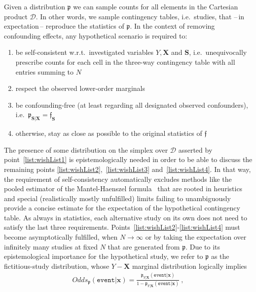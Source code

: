 \documentclass[10pt]{article}
\newcommand{\equ}[1]{\begin{gather} #1 \end{gather}}
\newcommand{\prob}[1]{\mathfrak{#1}}
\begin{document}
Given a distribution $\prob p$ we can sample counts for all elements in the Cartesian product $\mathcal D$. In other words, we sample %
contingency tables, i.e.\ studies, that --\,in expectation\,-- reproduce the statistics of $\prob p$. 
%
In the context of removing confounding effects, any hypothetical scenario is required  to: 
\begin{enumerate}
    \item be self-consistent w.r.t.\ investigated variables $Y,\boldsymbol X$ and $\boldsymbol S$, i.e.\ unequivocally prescribe counts %
    for each cell in the three-way contingency table with all entries summing to $N$ \label{list:wishList1}
    \item respect the observed lower-order marginals \label{list:wishList2}
    \item be confounding-free (at least regarding all designated {observed} confounders)\label{list:wishList3}, i.e.\ $\prob p_{\boldsymbol S\vert\boldsymbol X}=\prob f_{\boldsymbol S}$
    \item otherwise, stay as close as possible to the original statistics of $\prob f$\label{list:wishList4}
\end{enumerate}
%
The presence of some distribution on the simplex over $\mathcal D$ asserted by point~\ref{list:wishList1} is epistemologically needed in order to be able to discuss the remaining points \ref{list:wishList2},~\ref{list:wishList3} and~\ref{list:wishList4}. %
In that way, the requirement of self-consistency automatically excludes methods like the pooled estimator of the Mantel-Haenszel formula~\cite{10.1093/jnci/22.4.719} that are rooted in heuristics and special (realistically mostly unfulfilled)  limits failing to unambiguously provide a concise estimate for the expectation of the hypothetical contingency table.
%
As always in statistics, each alternative study on its own does not need to satisfy the last three requirements. Points~\ref{list:wishList2}-\ref{list:wishList4} must become asymptotically fulfilled, when $N\rightarrow\infty$ or by taking the expectation over infinitely many studies at fixed $N$ that are generated from $\prob p$. 
%
Due to its epistemological importance for the hypothetical study, we refer to $\prob p$ as the fictitious-study distribution, whose $Y-\boldsymbol  X$ marginal distribution logically implies
\equ{
Odds_{\prob p}(\texttt{event}\vert \boldsymbol x) = \frac{\prob p_{Y\vert\boldsymbol  X}(\texttt{event}\vert \boldsymbol x)}{1-\prob p_{Y\vert\boldsymbol  X}(\texttt{event}\vert \boldsymbol  x)}~,
}
\end{document}

